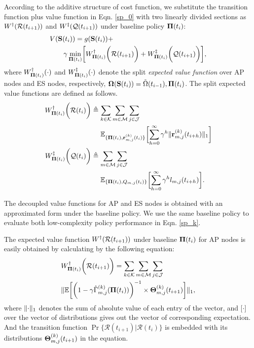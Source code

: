 According to the additive structure of cost function, we substitute the transition function plus value function in Eqn. \ref{sp_0} with two linearly divided sections as $W^{\dagger}(\mathcal{R}(t_{i+1}))$ and $W^{\ddagger}(\mathcal{Q}(t_{i+1}))$ under baseline policy $\boldsymbol{\Pi}(t_{i})$:
\begin{align}
    &V(\Stat(t_{i})) = g(\Stat(t_{i})) +
    \nonumber\\
    &~~~~~~\gamma \min_{\BaseLine(t_i)} \Bracket{ W^{\AP}_{\BaseLine(t_i)}\Paren{\mathcal{R}(t_{i+1})} + W^{\ES}_{\BaseLine(t_i)}\Paren{\mathcal{Q}(t_{i+1})} },
\end{align}
where $W^{\dagger}_{\boldsymbol{\Pi}(t_i)}(\cdot)$ and $W^{\ddagger}_{\boldsymbol{\Pi}(t_i)}(\cdot)$ denote the split \emph{expected value function} over AP nodes and ES nodes, respectively, $\boldsymbol{\Omega}(\mathbf{S}(t_{i})) = \tilde{\Omega}(t_{i-1}), \boldsymbol{\Pi}(t_i)$. The split expected value functions are defined as follows.
\begin{align}
    W^{\AP}_{\BaseLine(t_i)}\Paren{\mathcal{R}(t_{i})}
        &\define \sum_{k\in\apSet}\sum_{m\in\esSet}\sum_{j\in\jSpace}
        \nonumber\\
        &~~~~\mathbb{E}_{\{\BaseLine(t_i), \vec{r}^{(k)}_{m,j}(t_{i})\}}\Bracket{
            \sum_{h=0}^{\infty} \gamma^{h} \Inorm{\vec{r}^{(k)}_{m,j}(t_{i+h})}
        }
    \\
    W^{\ES}_{\BaseLine(t_i)}\Paren{\mathcal{Q}(t_{i})}
        &\define \sum_{m\in\esSet}\sum_{j\in\jSpace}
        \nonumber\\
        &~~~~\mathbb{E}_{\{\BaseLine(t_i), Q_{m,j}(t_{i})\}}\Bracket{
            \sum_{h=0}^{\infty} \gamma^{h} l_{m,j}(t_{i+h})
        }.
\end{align}
        
The decoupled value functions for AP and ES nodes is obtained with an approximated form under the baseline policy. We use the same baseline policy to evaluate both low-complexity policy performance in Eqn. \ref{sp_k}.
        
The expected value function $W^{\dagger}(\mathcal{R}(t_{i+1}))$ under baseline $\boldsymbol{\Pi}(t_{i})$ for AP nodes is easily obtained by calculating by the following equation:
\begin{align}
    &W^{\dagger}_{\boldsymbol{\Pi}(t_i)}\bigg(\mathcal{R}(t_{i+1})\bigg) = \sum_{k\in\mathcal{K}}\sum_{m\in\mathcal{M}}\sum_{j\in\mathcal{J}}
    \nonumber\\
    & \lVert
        \mathbb{E}\bigg[
            \bigg(
                1 - \gamma \hat{\Gamma}^{(k)}_{m,j}(\boldsymbol{\Pi}(t_{i}))
            \bigg)^{-1} \times \boldsymbol{\Theta}^{(k)}_{m,j}(t_{i+1})
        \bigg]
    \|_1,
    \label{w_ap}
\end{align}
where $\lVert\cdot\|_1$ denotes the sum of absolute value of each entry of the vector, and $\mathbb[\cdot]$ over the vector of distributions gives out the vector of corresponding expectation. And the transition function $\Pr\{ \mathcal{R}(t_{i+1})|\mathcal{R}(t_{i}) \}$ is embedded with its distributions $\boldsymbol{\Theta}^{(k)}_{m,j}(t_{i+1})$ in the equation.

